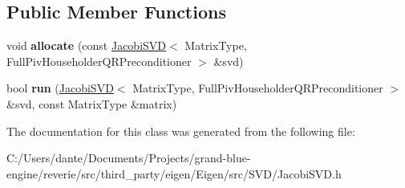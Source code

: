 \subsection*{Public Member Functions}
\begin{DoxyCompactItemize}
\item 
\mbox{\label{class_eigen_1_1internal_1_1qr__preconditioner__impl_3_01_matrix_type_00_01_full_piv_householder_0bfd000ff4c8127883e77da4144b4435_a42354f06b00258ab291e4d374caa5fd9}} 
void {\bfseries allocate} (const \mbox{\hyperlink{class_eigen_1_1_jacobi_s_v_d}{Jacobi\+S\+VD}}$<$ Matrix\+Type, Full\+Piv\+Householder\+Q\+R\+Preconditioner $>$ \&svd)
\item 
\mbox{\label{class_eigen_1_1internal_1_1qr__preconditioner__impl_3_01_matrix_type_00_01_full_piv_householder_0bfd000ff4c8127883e77da4144b4435_a31e087de4ff8d6e54fb71faccbb07c63}} 
bool {\bfseries run} (\mbox{\hyperlink{class_eigen_1_1_jacobi_s_v_d}{Jacobi\+S\+VD}}$<$ Matrix\+Type, Full\+Piv\+Householder\+Q\+R\+Preconditioner $>$ \&svd, const Matrix\+Type \&matrix)
\end{DoxyCompactItemize}


The documentation for this class was generated from the following file\+:\begin{DoxyCompactItemize}
\item 
C\+:/\+Users/dante/\+Documents/\+Projects/grand-\/blue-\/engine/reverie/src/third\+\_\+party/eigen/\+Eigen/src/\+S\+V\+D/Jacobi\+S\+V\+D.\+h\end{DoxyCompactItemize}

